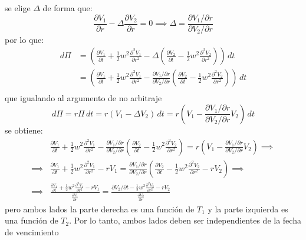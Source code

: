 se elige $\Delta$ de forma que:
\begin{equation*}
    \frac{\partial V_1}{\partial r} - \Delta \frac{\partial V_2}{\partial r} = 0 \implies \Delta = \frac{\partial V_1/\partial r}{\partial V_2/\partial r}
\end{equation*}
por lo que:
\begin{align*}
    d\Pi &= \left( \frac{\partial V_1}{\partial t} + \frac{1}{2} w^2 \frac{\partial^2 V_1}{\partial r^2} - \Delta \left( \frac{\partial V_2}{\partial t} - \frac{1}{2} w^2 \frac{\partial^2 V_2}{\partial r^2} \right) \right)\,dt \\
    &= \left( \frac{\partial V_1}{\partial t} + \frac{1}{2} w^2 \frac{\partial^2 V_1}{\partial r^2} - \frac{\partial V_1/\partial r}{\partial V_2/\partial r} \left( \frac{\partial V_2}{\partial t} - \frac{1}{2} w^2 \frac{\partial^2 V_2}{\partial r^2} \right) \right)\,dt \\
\end{align*}
que igualando al argumento de no arbitraje
\begin{equation*}
    d\Pi = r \Pi\,dt = r \left( V_1 - \Delta V_2 \right)\,dt = r \left( V_1 - \frac{\partial V_1/\partial r}{\partial V_2/\partial r} V_2 \right)\,dt
\end{equation*}
se obtiene:
\begin{align*}
    &\frac{\partial V_1}{\partial t} + \frac{1}{2} w^2 \frac{\partial^2 V_1}{\partial r^2} - \frac{\partial V_1/\partial r}{\partial V_2/\partial r} \left( \frac{\partial V_2}{\partial t} - \frac{1}{2} w^2 \frac{\partial^2 V_2}{\partial r^2} \right) = r \left( V_1 - \frac{\partial V_1/\partial r}{\partial V_2/\partial r} V_2 \right) \implies \\[1.5em]
    \implies &\frac{\partial V_1}{\partial t} + \frac{1}{2} w^2 \frac{\partial^2 V_1}{\partial r^2} - rV_1 = \frac{\partial V_1/\partial r}{\partial V_2/\partial r} \left( \frac{\partial V_2}{\partial t} - \frac{1}{2} w^2 \frac{\partial^2 V_2}{\partial r^2} - rV_2 \right) \implies \\[1.5em]
    \implies &\frac{\frac{\partial V_1}{\partial t} + \frac{1}{2} w^2 \frac{\partial^2 V_1}{\partial r^2} - rV_1}{\frac{\partial V_1}{\partial r}} = \frac{\partial V_2/\partial t - \frac{1}{2} w^2 \frac{\partial^2 V_2}{\partial r^2} - rV_2}{\frac{\partial V_2}{\partial r}}
\end{align*}
pero ambos lados la parte derecha es una función de $T_1$ y la parte izquierda es una función de $T_2$. Por lo tanto, ambos lados deben ser independientes de la fecha de vencimiento
